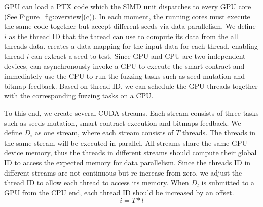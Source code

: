 GPU can load a PTX code which the SIMD unit dispatches to every GPU core (See Figure~\ref{fig:overview}(c)). 
In each moment, the running cores must execute the same code together but accept different seeds via data parallelism\cite{cuda2006datapara}.
We define $i$ as the thread ID that the thread can use to compute its data from the all threads data.
%
{\runner} creates a data mapping for the input data for each thread, enabling thread $i$ can extract a seed to test.
%
Since GPU and CPU are two independent devices, {\runner} can asynchronously invoke a GPU to execute the smart contract and immediately use the CPU to run the fuzzing tasks such as seed mutation and bitmap feedback.
%
Based on thread ID, we can schedule the GPU threads together with the corresponding fuzzing tasks on a CPU. 

%
%


To this end, we create several CUDA streams.
Each stream consists of three tasks such as seeds mutation, smart contract execution and bitmaps feedback. 
We define $D_i$ as one stream, where each stream consists of $T$ threads. 
The threads in the same stream will be executed in parallel. 
All streams share the same GPU device memory, thus the threads in different streams should compute their global ID to access the expected memory for data parallelism.
%
Since the threads ID in different streams are not continuous but re-increase from zero, we adjust the thread ID to allow each thread to access its memory.
%
When $D_l$ is submitted to a GPU from the CPU end, each thread ID should be increased by an offset.
$$
i = T*l
$$

